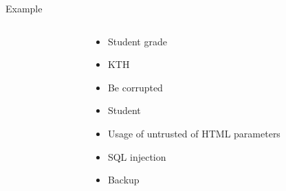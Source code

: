 \documentclass{beamer}
\begin{document}
\begin{frame}{Example}
\begin{columns}[onlytextwidth]
\begin{column}{0.4\textwidth}
  \end{column}

    \begin{column}{0.6\textwidth}
  \begin{itemize}
  \item<1-> Student grade
  \item<2-> KTH
  \item<3-> Be corrupted
  \item<4-> Student
  \item<5-> Usage of untrusted of HTML parameters
  \item<6-> SQL injection
  \item<7>  Backup
  \end{itemize}
  \end{column}
\end{columns}
\end{frame}
\end{document}
